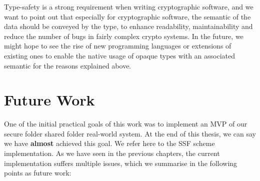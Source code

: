 Type-safety is a strong requirement when writing
cryptographic software, and we want to point out that especially for cryptographic
software, the semantic of the data should be conveyed by the type,
to enhance readability, maintainability and reduce the number of
bugs in fairly complex crypto systems.
In the future, we
might hope to see the rise of new programming languages
or extensions of existing ones to enable the native usage
of opaque types with an associated semantic for the reasons 
explained above.


\section{Future Work}\label{sc:future-work}

One of the initial practical goals of this work
was to implement an MVP of our secure folder shared folder
real-world system. At the end of this thesis,
we can say we have \textbf{almost} achieved this goal.
We refer here to the SSF scheme implementation.
As we have seen in the previous chapters,
the current implementation suffers multiple issues,
which we summarise in the following points as future work:
